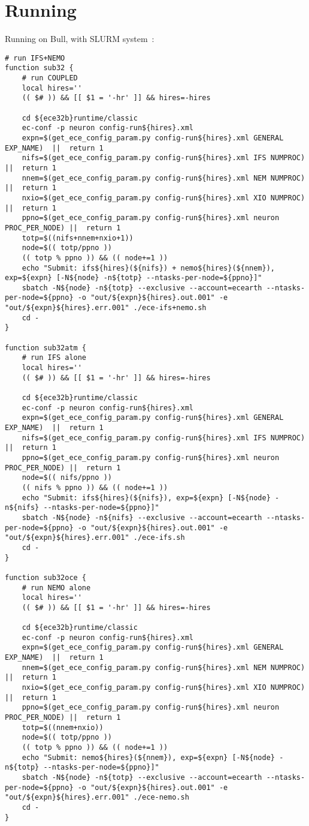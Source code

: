 \section{Running}
Running on Bull, with SLURM system~\cite{slurm}:
\begin{lstlisting}
# run IFS+NEMO
function sub32 {
    # run COUPLED
    local hires=''
    (( $# )) && [[ $1 = '-hr' ]] && hires=-hires
    
    cd ${ece32b}runtime/classic
    ec-conf -p neuron config-run${hires}.xml
    expn=$(get_ece_config_param.py config-run${hires}.xml GENERAL EXP_NAME)  ||  return 1
    nifs=$(get_ece_config_param.py config-run${hires}.xml IFS NUMPROC)    ||  return 1
    nnem=$(get_ece_config_param.py config-run${hires}.xml NEM NUMPROC)    ||  return 1
    nxio=$(get_ece_config_param.py config-run${hires}.xml XIO NUMPROC)    ||  return 1
    ppno=$(get_ece_config_param.py config-run${hires}.xml neuron PROC_PER_NODE) ||  return 1 
    totp=$((nifs+nnem+nxio+1))
    node=$(( totp/ppno ))
    (( totp % ppno )) && (( node+=1 ))
    echo "Submit: ifs${hires}(${nifs}) + nemo${hires}(${nnem}), exp=${expn} [-N${node} -n${totp} --ntasks-per-node=${ppno}]"
    sbatch -N${node} -n${totp} --exclusive --account=ecearth --ntasks-per-node=${ppno} -o "out/${expn}${hires}.out.001" -e "out/${expn}${hires}.err.001" ./ece-ifs+nemo.sh
    cd -
}

function sub32atm {
    # run IFS alone
    local hires=''
    (( $# )) && [[ $1 = '-hr' ]] && hires=-hires

    cd ${ece32b}runtime/classic
    ec-conf -p neuron config-run${hires}.xml
    expn=$(get_ece_config_param.py config-run${hires}.xml GENERAL EXP_NAME)  ||  return 1
    nifs=$(get_ece_config_param.py config-run${hires}.xml IFS NUMPROC)    ||  return 1
    ppno=$(get_ece_config_param.py config-run${hires}.xml neuron PROC_PER_NODE) ||  return 1
    node=$(( nifs/ppno ))
    (( nifs % ppno )) && (( node+=1 ))
    echo "Submit: ifs${hires}(${nifs}), exp=${expn} [-N${node} -n${nifs} --ntasks-per-node=${ppno}]"
    sbatch -N${node} -n${nifs} --exclusive --account=ecearth --ntasks-per-node=${ppno} -o "out/${expn}${hires}.out.001" -e "out/${expn}${hires}.err.001" ./ece-ifs.sh
    cd -
}

function sub32oce {
    # run NEMO alone
    local hires=''
    (( $# )) && [[ $1 = '-hr' ]] && hires=-hires

    cd ${ece32b}runtime/classic
    ec-conf -p neuron config-run${hires}.xml
    expn=$(get_ece_config_param.py config-run${hires}.xml GENERAL EXP_NAME)  ||  return 1
    nnem=$(get_ece_config_param.py config-run${hires}.xml NEM NUMPROC)    ||  return 1
    nxio=$(get_ece_config_param.py config-run${hires}.xml XIO NUMPROC)    ||  return 1
    ppno=$(get_ece_config_param.py config-run${hires}.xml neuron PROC_PER_NODE) ||  return 1
    totp=$((nnem+nxio))
    node=$(( totp/ppno ))
    (( totp % ppno )) && (( node+=1 ))
    echo "Submit: nemo${hires}(${nnem}), exp=${expn} [-N${node} -n${totp} --ntasks-per-node=${ppno}]"
    sbatch -N${node} -n${totp} --exclusive --account=ecearth --ntasks-per-node=${ppno} -o "out/${expn}${hires}.out.001" -e "out/${expn}${hires}.err.001" ./ece-nemo.sh
    cd -
}

\end{lstlisting}
